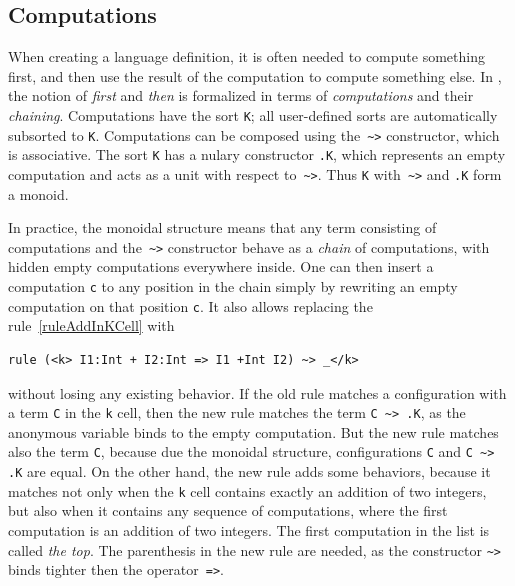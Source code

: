 \documentclass{fithesis3}
\begin{document}
\subsection{Computations}
When creating a language definition, it is often needed to compute something first, and then use the result of the computation to compute something else. In \K, the notion of \textit{first} and \textit{then} is formalized in terms of \textit{computations} and their \textit{chaining}. Computations have the sort \texttt{K}; all user-defined sorts are automatically subsorted to \texttt{K}. Computations can be composed using the~\lstinline{~>}{} constructor, which is associative. The sort \texttt{K} has a nulary constructor \texttt{.K}, which represents an empty computation and acts as a unit with respect to~\lstinline{~>}{}. Thus \texttt{K} with~\lstinline{~>}{} and \texttt{.K} form a monoid.

In practice, the monoidal structure means that any term consisting of computations and the~\lstinline{~>}{} constructor behave as a \textit{chain} of computations, with hidden empty computations everywhere inside. One can then insert a computation \texttt{c} to any position in the chain simply by rewriting an empty computation on that position \texttt{c}. It also allows replacing the rule~\ref{ruleAddInKCell} with
\begin{lstlisting}
rule (<k> I1:Int + I2:Int => I1 +Int I2) ~> _</k>
\end{lstlisting}
without losing any existing behavior. If the old rule matches a configuration with a term \lstinline{C}{} in the \texttt{k} cell, then the new rule matches the term \lstinline{C ~> .K}{}, as the anonymous variable binds to the empty computation. But the new rule matches also the term \lstinline{C}{}, because due the monoidal structure, configurations \lstinline{C}{} and \lstinline{C ~> .K}{} are equal.
On the other hand, the new rule adds some behaviors, because it matches not only when the \texttt{k} cell contains exactly an addition of two integers, but also when it contains any sequence of computations, where the first computation is an addition of two integers. The first computation in the list is called \textit{the top}.
The parenthesis in the new rule are needed, as the constructor \lstinline{~>}{} binds tighter then the operator~\lstinline{=>}{}.
\end{document}
